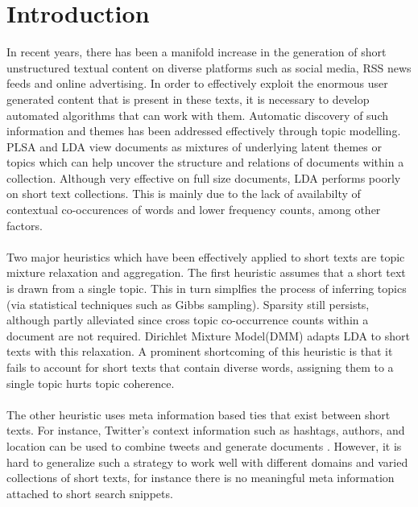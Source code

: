 \documentclass{sig-alternate-05-2015}
\begin{document}


\section{Introduction}
In recent years, there has been a manifold increase in the generation of short unstructured textual content on diverse platforms such as social media, RSS news feeds and online advertising. In order to effectively exploit the enormous user generated content that is present in these texts, it is necessary to develop automated algorithms that can work with them. Automatic discovery of such information and themes has been addressed effectively through topic modelling. PLSA\cite{plsa} and LDA\cite{lda} view documents as mixtures of underlying latent themes or topics which can help uncover the structure and relations of documents within a collection. Although very effective on full size documents, LDA performs poorly on short text collections. This is mainly due to the lack of availabilty of contextual co-occurences of words and lower frequency counts\cite{wang}, among other factors.
\\
\\
Two major heuristics which have been effectively applied to short texts are topic mixture relaxation and aggregation. The first heuristic assumes that a short text is drawn from a single topic. This in turn simplfies the process of inferring topics (via statistical techniques such as Gibbs sampling). Sparsity still persists, although partly alleviated since cross topic co-occurrence counts within a document are not required. Dirichlet Mixture Model(DMM)\cite{dmm} adapts LDA to short texts with this relaxation. A prominent shortcoming of this heuristic is that it fails to account for short texts that contain diverse words, assigning them to a single topic hurts topic coherence.
\\
\\
The other heuristic uses meta information based ties that exist between short texts. For instance, Twitter's context information such as hashtags, authors, and location can be used to combine tweets and generate documents \cite{mehrotra}. However, it is hard to generalize such a strategy to work well with different domains and varied collections of short texts, for instance there is no meaningful meta information attached to short search snippets.
\end{document}
